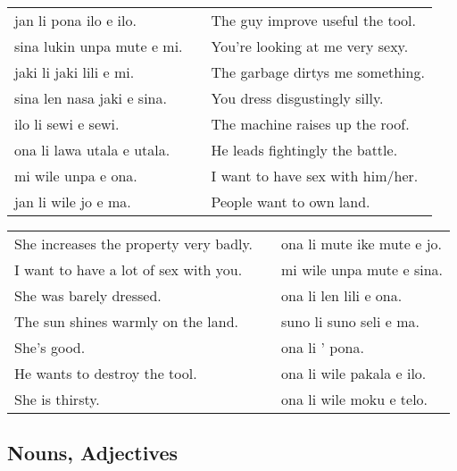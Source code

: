 \begin{supertabular}{p{5,5cm}|ll}
    jan li pona ilo e ilo.     &  & The guy improve useful the tool. \\
    sina lukin unpa mute e mi. &  & You're looking at me very sexy.  \\
    jaki li jaki lili e mi.    &  & The garbage dirtys me something. \\
    sina len nasa jaki e sina. &  & You dress disgustingly silly.    \\
    ilo li sewi e sewi.        &  & The machine raises up the roof.  \\
    ona li lawa utala e utala. &  & He leads fightingly the battle.  \\
    mi wile unpa e ona.        &  & I want to have sex with him/her. \\
    jan li wile jo e ma.       &  & People want to own land.         \\
\end{supertabular}

\begin{supertabular}{p{5,5cm}|ll}
    She increases the property very badly. &  & ona li mute ike mute e jo. \\
    I want to have a lot of sex with you.  &  & mi wile unpa mute e sina.  \\
    She was barely dressed.                &  & ona li len lili e ona.     \\
    The sun shines warmly on the land.     &  & suno li suno seli e ma.    \\
    She's good.                            &  & ona li ' pona.             \\
    He wants to destroy the tool.          &  & ona li wile pakala e ilo.  \\
    She is thirsty.                        &  & ona li wile moku e telo.   \\
\end{supertabular}

\newpage

\subsection*{Nouns, Adjectives}
\label{'adjectives'}

